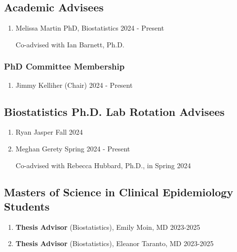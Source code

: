 \documentclass[letterpaper,11pt]{article} %
\begin{document}
    \subsection*{Academic Advisees}
    \begin{enumerate}
        \item Melissa Martin \hfill PhD, Biostatistics \hfill 2024 - 
        Present \\
        \begin{minipage}{\linewidth}
			\begin{flushleft}
			{\small Co-advised with Ian Barnett, Ph.D.}
			\end{flushleft}
		\end{minipage}
    \end{enumerate}

    \subsubsection*{PhD Committee Membership}
    \begin{enumerate}
        \item Jimmy Kelliher (Chair) \hfill 2024 - Present
    \end{enumerate}
    
    \subsection*{Biostatistics Ph.D. Lab Rotation Advisees}
    \begin{enumerate}
    	\item Ryan Jasper \hfill Fall 2024
    	\item Meghan Gerety \hfill Spring 2024 - Present \\
        \begin{minipage}{\linewidth}
			\begin{flushleft}
			{\small Co-advised with Rebecca Hubbard, Ph.D., in Spring 2024}
			\end{flushleft}
		\end{minipage}
    \end{enumerate}
    
    \subsection*{Masters of Science in Clinical Epidemiology Students}
    \begin{enumerate}
    	\item \textbf{Thesis Advisor} (Biostatistics), Emily Moin, MD \hfill 2023-2025
    	\item \textbf{Thesis Advisor} (Biostatistics), Eleanor Taranto, MD \hfill 2023-2025
    \end{enumerate}
	
\end{document}

